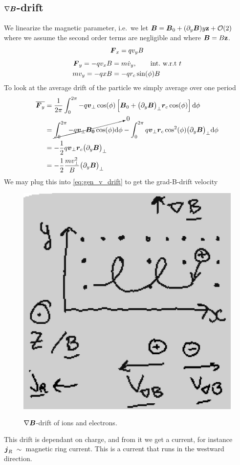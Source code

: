 \subsection{\(\nabla\boldsymbol{B}\)-drift}
We linearize the magnetic parameter, i.e.\ we let \(\boldsymbol{B}=\boldsymbol{B}_0+(\partial_y\boldsymbol{B})y\mathbf{z}+\mathcal{O}(2)\) where we assume the second order terms are negligible and where \(\boldsymbol{B}=B\mathbf{z}\).
\begin{equation*}
    \boldsymbol{F}_x=qv_{y}B
\end{equation*}
\begin{align*}
    \boldsymbol{F}_y=-qv_{x}B&=m\dot{v}_y,\qquad\text{int.\ w.r.t } t\\
    mv_y=-qxB&=-qr_c\sin(\phi)B
\end{align*}
To look at the average drift of the particle we simply average over one period
\begin{align*}
    \overline{\boldsymbol{F}_y}&=\frac{1}{2\pi}\int_0^{2\pi}-q\boldsymbol{v}_\perp\cos(\phi)\left[\boldsymbol{B}_0+{\left(\partial_{y}\boldsymbol{B}\right)}_\perp\boldsymbol{r}_c\cos(\phi)\right]\text{d}\phi \\
    &=\cancelto{0}{\int_0^{2\pi}-q\boldsymbol{v}_\perp\boldsymbol{B_0}\cos(\phi)\text{d}\phi}-\int_0^{2\pi}q\boldsymbol{v}_\perp\boldsymbol{r}_c\cos^2(\phi){\left(\partial_{y}\boldsymbol{B}\right)}_\perp\text{d}\phi \\
    &=-\frac{1}{2}q\boldsymbol{v}_\perp\boldsymbol{r}_c{\left(\partial_{y}\boldsymbol{B}\right)}_\perp \\
    &=-\frac{1}{2}\frac{mv_\perp^2}{B}{\left(\partial_{y}\boldsymbol{B}\right)}_\perp
\end{align*}
We may plug this into \cref{eq:gen_v_drift} to get the grad-B-drift velocity
\begin{figure}[t]
    \centering
    \includegraphics[width=0.2\linewidth]{bilder/gradB.jpg}\label{fig:gradB}
    \caption{\(\nabla\boldsymbol{B}\)-drift of ions and electrons.}
\end{figure}
This drift is dependant on charge, and from it we get a current, for instance \(\boldsymbol{j}_R~\sim \)~magnetic ring current. This is a current that runs in the westward direction.

